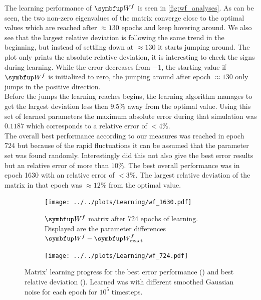 The learning performance of $\bmu{W}^f$ is seen in \cref{fig:wf_analyses}. As can be seen, the two non-zero eigenvalues of the matrix converge close to the
optimal values which are reached after $\approx 130$ epochs and keep hovering around.
We also see that the largest relative deviation is following the same trend in the beginning, but instead of settling down at $\approx 130$ it starts jumping around. The plot only prints the absolute relative deviation, it is interesting to check the signs during learning. While the error decreases from $-1$, the starting value if $\bmu{W}^f$ is initialized to zero, the jumping around after epoch $\approx 130$ only jumps in the positive direction.\\
Before the jumps the learning reaches begins, the learning algorithm manages to get the largest deviation less then $9.5\%$ away from the optimal value. Using this set of learned parameters the maximum absolute error during that simulation was $0.1187$ which corresponds to a relative error of $<4\%$.\\
The overall best performance according to our measures was reached in epoch 724 but because of the rapid fluctuations it can be assumed that the parameter set was found randomly. Interestingly did this not also give the best error results but an relative error of more than $10\%$. The best overall performance was in epoch 1630 with an relative error of $<3\%$. The largest relative deviation of the matrix  in that epoch was $\approx 12\%$ from the optimal value.\\
\begin{figure}
	\centering
	\begin{subfigure}[t]{0.48\textwidth}
		\texttt{[image: ../../plots/Learning/wf\_1630.pdf]}
		\caption{$\bmu{W}^f$ matrix after 724 epochs of learning. Displayed are the parameter differences $\bmu{W}^f - \bmu{W}^f_{\text{exact}}$ }  %
		\label{fig:subfig1}  %
	\end{subfigure}
	\hspace{0.02\textwidth}  %
	\begin{subfigure}[t]{0.48\textwidth}
		\texttt{[image: ../../plots/Learning/wf\_724.pdf]}
		\label{fig:subfig2}  %
	\end{subfigure}
\caption{Matrix' learning progress for the best error performance () and best relative deviation (). Learned was with different smoothed Gaussian noise for each epoch for $10^5$ timesteps.}
\label{fig:epoch_viz}
\end{figure}
